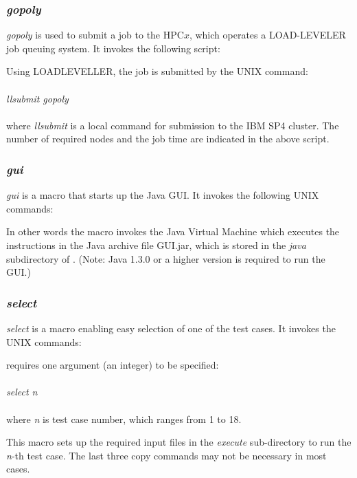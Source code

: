 \subsubsection*{{\sl gopoly}}

{\sl gopoly} is used to submit a \D job to the HPC$x$, which operates
a LOAD-LEVELER job queuing system.  It invokes the following script:



\noindent Using LOADLEVELLER, the job is submitted by the UNIX command: \\
\\
{\sl llsubmit gopoly} \\
\\
\noindent where {\sl llsubmit} is a local command for submission
to the IBM SP4 cluster.  The number of required nodes and the job
time are indicated in the above script.

\subsubsection*{\sl gui}

{\sl gui} is a macro that starts up the \D Java GUI.  It invokes
the following UNIX commands:



\noindent In other words the macro invokes the Java Virtual Machine
which executes the instructions in the Java archive file GUI.jar,
which is stored in the {\em java} subdirectory of \D. (Note: Java
1.3.0 or a higher version is required to run the GUI.)

\subsubsection*{{\sl select}}

{\sl select} is a macro enabling easy selection of one of the test
cases.  It invokes the UNIX commands:



 requires one argument (an integer) to be specified: \\
\\
{\sl select n} \\
\\
\noindent where {\sl n} is test case number, which ranges from 1 to
18.

This macro sets up the required input files in the {\em execute}
sub-directory to run the {\sl n}-th test
case.  The last three copy commands may not be necessary in most cases.

